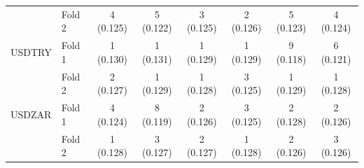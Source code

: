 \begin{table}[H]
\begin{tabular}{l l cccccc}
 & Fold 2 & 4 (0.125) & 5 (0.122) & 3 (0.125) & 2 (0.126) & 5 (0.123) & 4 (0.124) \\
USDTRY & Fold 1 & 1 (0.130) & 1 (0.131) & 1 (0.129) & 1 (0.129) & 9 (0.118) & 6 (0.121) \\
 & Fold 2 & 2 (0.127) & 1 (0.129) & 1 (0.128) & 3 (0.125) & 1 (0.129) & 1 (0.128) \\
USDZAR & Fold 1 & 4 (0.124) & 8 (0.119) & 2 (0.126) & 3 (0.125) & 2 (0.128) & 2 (0.126) \\
 & Fold 2 & 1 (0.128) & 3 (0.127) & 2 (0.127) & 1 (0.128) & 2 (0.126) & 3 (0.126) \\
\bottomrule
\end{tabular}
\end{table}

